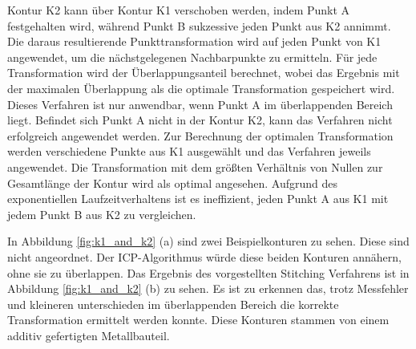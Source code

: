 Kontur K2 kann über Kontur K1 verschoben werden, indem Punkt A festgehalten wird, 
während Punkt B sukzessive jeden Punkt aus K2 annimmt. 
Die daraus resultierende Punkttransformation wird auf jeden Punkt von K1 angewendet, 
um die nächstgelegenen Nachbarpunkte zu ermitteln. Für jede Transformation wird der 
Überlappungsanteil berechnet, wobei das Ergebnis mit der maximalen Überlappung
als die optimale Transformation gespeichert wird.
Dieses Verfahren ist nur anwendbar, wenn Punkt A im überlappenden Bereich liegt. 
Befindet sich Punkt A nicht in der Kontur K2, 
kann das Verfahren nicht erfolgreich angewendet werden.
Zur Berechnung der optimalen Transformation werden verschiedene Punkte aus K1 
ausgewählt und das Verfahren jeweils angewendet. 
Die Transformation mit dem größten Verhältnis von Nullen zur
Gesamtlänge der Kontur wird als optimal angesehen. 
Aufgrund des exponentiellen Laufzeitverhaltens ist es ineffizient, 
jeden Punkt A aus K1 mit jedem Punkt B aus K2 zu vergleichen.

In Abbildung \ref{fig:k1_and_k2} (a) sind zwei Beispielkonturen zu sehen. 
Diese sind nicht angeordnet. Der ICP-Algorithmus würde diese beiden Konturen 
annähern, ohne sie zu überlappen. 
Das Ergebnis des vorgestellten Stitching Verfahrens ist in Abbildung 
\ref{fig:k1_and_k2} (b) zu sehen. Es ist zu erkennen das, trotz Messfehler und 
kleineren unterschieden im überlappenden Bereich die korrekte Transformation 
ermittelt werden konnte. Diese Konturen stammen von einem additiv gefertigten 
Metallbauteil.

